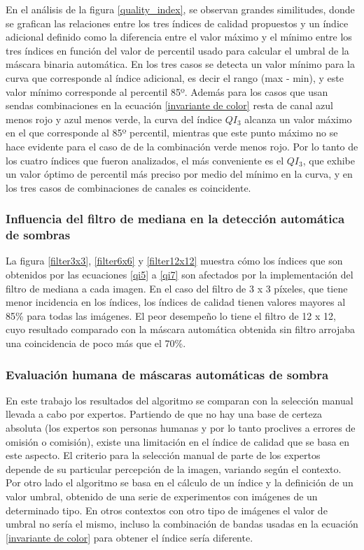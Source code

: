En el análisis de la figura \ref{quality_index}, se observan grandes similitudes, donde se grafican las relaciones entre los tres índices de calidad propuestos y un índice adicional definido como la diferencia entre el valor máximo y el mínimo entre los tres índices en función del valor de percentil usado para calcular el umbral de la máscara binaria automática. En los tres casos se detecta un valor mínimo para la curva que corresponde al índice adicional, es decir el rango (max - min), y este valor mínimo corresponde al percentil 85º. Además para los casos que usan sendas combinaciones en la ecuación \ref{invariante de color} resta de canal azul menos rojo y azul menos verde, la curva del índice $QI_3$ alcanza un valor máximo en el que corresponde al 85º percentil, mientras que este punto máximo no se hace evidente para el caso de de la combinación verde menos rojo. Por lo tanto de los cuatro índices que fueron analizados, el más conveniente es el $QI_3$, que exhibe un valor óptimo de percentil más preciso por medio del mínimo en la curva, y en los tres casos de combinaciones de canales es coincidente.

\subsubsection{Influencia del filtro de mediana en la detección automática de sombras}

La figura \ref{filter3x3}, \ref{filter6x6} y \ref{filter12x12} muestra cómo los índices que son obtenidos por las ecuaciones \ref{qi5} a \ref{qi7} son afectados por la implementación del filtro de mediana a cada imagen. En el caso del filtro de 3 x 3 píxeles, que tiene menor incidencia en los índices, los índices de calidad tienen valores mayores al 85\% para todas las imágenes. El peor desempeño lo tiene el filtro de 12 x 12, cuyo resultado comparado con la máscara automática obtenida sin filtro arrojaba una coincidencia de poco más que el 70\%.

\subsubsection{Evaluación humana de máscaras automáticas de sombra}

En este trabajo los resultados del algoritmo se comparan con la selección manual llevada a cabo por expertos. Partiendo de que no hay una base de certeza absoluta (los expertos son personas humanas y por lo tanto proclives a errores de omisión o comisión), existe una limitación en el índice de calidad que se basa en este aspecto. El criterio para la selección manual de parte de los expertos depende de su particular percepción de la imagen, variando según el contexto. Por otro lado el algoritmo se basa en el cálculo de un índice y la definición de un valor umbral, obtenido de una serie de experimentos con imágenes de un determinado tipo. En otros contextos con otro tipo de imágenes el valor de umbral no sería el mismo, incluso la combinación de bandas usadas en la ecuación \ref{invariante de color} para obtener el índice sería diferente.

